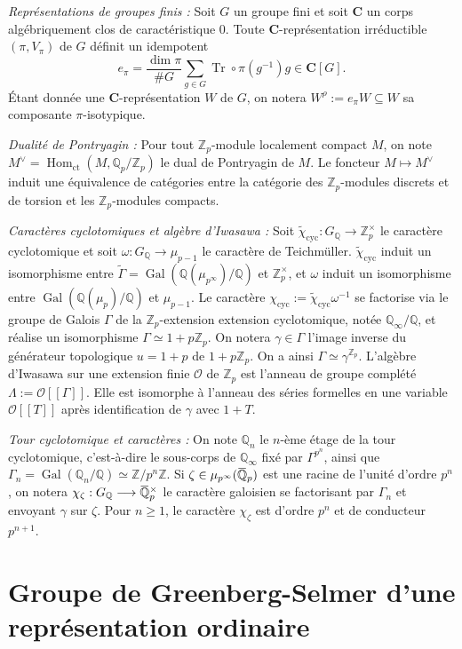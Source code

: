 \documentclass[12pt]{amsart}
\newcommand\bZ{\mathbb{Z}}
\newcommand\bQ{\mathbb{Q}}
\newcommand\Zp{{\mathbb{Z}_{p}}}
\newcommand\Qp{\mathbb{Q}_{p}}
\newcommand\cO{\mathcal{O}}
\newcommand{\ob}[1]{\mkern 1.5mu\overline{\mkern-1.5mu#1\mkern-1.5mu}\mkern 1.5mu}
\DeclareMathOperator{\Gal}{Gal}
\DeclareMathOperator{\Hom}{Hom}
\DeclareMathOperator{\Tr}{Tr}
\DeclareMathOperator{\cyc}{cyc}
\theoremstyle{defstyle}
\theoremstyle{thmstyle}
\begin{document}
\textit{Représentations de groupes finis :} Soit $G$ un groupe fini et soit \textbf{C} un corps algébriquement clos de caractéristique 0. Toute \textbf{C}-représentation irréductible $(\pi,V_\pi)$ de $G$ définit un idempotent
$$ e_\pi = \dfrac{\dim \pi}{\#G} \sum_{g\in G}\Tr \circ \pi(g^{-1})g \in \textbf{C}[G]. $$
\'Etant donnée une \textbf{C}-représentation $W$ de $G$, on notera $W^\rho:=e_\pi W \subseteq W$ sa composante $\pi$-isotypique.

\textit{Dualité de Pontryagin :} 	
Pour tout $\Zp$-module localement compact $M$, on note $M^\vee=\Hom_\textrm{ct}(M,\Qp/\Zp)$ le dual de Pontryagin de $M$. Le foncteur $M \mapsto M^\vee$ induit une équivalence de catégories entre la catégorie des $\Zp$-modules discrets et de torsion et les $\Zp$-modules compacts.


\textit{Caractères cyclotomiques et algèbre d'Iwasawa :} Soit $\tilde{\chi}_{\cyc} : G_\bQ \longrightarrow \bZ^\times_p$ le caractère cyclotomique et soit $\omega : G_\bQ \longrightarrow \mu_{p-1}$ le caractère de Teichmüller. $\tilde{\chi}_{\cyc}$ induit un isomorphisme entre $\tilde{\Gamma}=\Gal(\bQ(\mu_{p^\infty})/\bQ)$ et $\bZ_p^\times$, et $\omega$ induit un isomorphisme entre $\Gal(\bQ(\mu_{p})/\bQ)$ et $\mu_{p-1}$. Le caractère $\chi_{\cyc}:=\tilde{\chi}_{\cyc}\omega^{-1}$ se factorise via le groupe de Galois $\Gamma$ de la $\Zp$-extension extension cyclotomique, notée $\bQ_\infty/\bQ$, et réalise un isomorphisme $\Gamma \simeq 1+p\Zp$. On notera $\gamma \in \Gamma$ l'image inverse du générateur topologique $u=1+p$ de $1+p\Zp$. On a ainsi $\Gamma \simeq \gamma^\Zp$. L'algèbre d'Iwasawa sur une extension finie $\cO$ de $\Zp$ est l'anneau de groupe complété $\Lambda:=\cO[[\Gamma]]$. Elle est isomorphe à l'anneau des séries formelles en une variable $\cO[[T]]$ après identification de $\gamma$ avec $1+T$.

\textit{Tour cyclotomique et caractères :} On note $\bQ_n$ le $n$-ème étage de la tour cyclotomique, c'est-à-dire le sous-corps de $\bQ_\infty$ fixé par $\Gamma^{p^n}$, ainsi que $\Gamma_n=\Gal(\bQ_n/\bQ) \simeq \bZ/p^n\bZ$. Si $\zeta \in \mu_{p^\infty}(\ob{\bQ}_p)$ est une racine de l'unité d'ordre $p^n$, on notera $\chi_\zeta : G_\bQ \longrightarrow \ob{\bQ}_p^\times$ le caractère galoisien se factorisant par $\Gamma_n$ et envoyant $\gamma$ sur $\zeta$. Pour $n\geq 1$, le caractère $\chi_\zeta$ est d'ordre $p^n$ et de conducteur $p^{n+1}$.
	

	\section{Groupe de Greenberg-Selmer d'une représentation ordinaire}
\label{section3}
	
\end{document}
